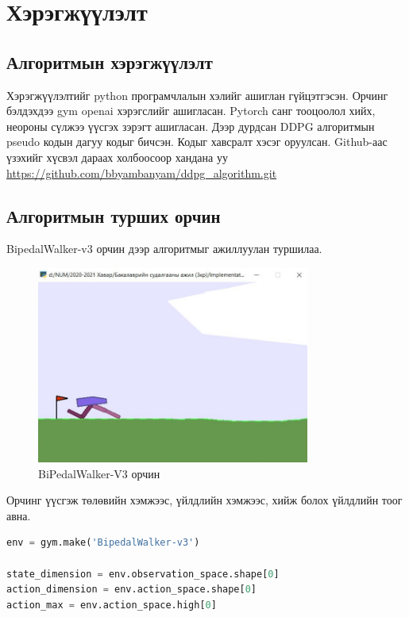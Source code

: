 \documentclass[12pt,A4]{report}
\begin{document}
\chapter{Хэрэгжүүлэлт}

\section{Алгоритмын хэрэгжүүлэлт}

Хэрэгжүүлэлтийг python програмчлалын хэлийг ашиглан гүйцэтгэсэн. Орчинг бэлдэхдээ gym openai хэрэгслийг ашигласан. Pytorch санг тооцоолол хийх, неороны сүлжээ үүсгэх зэрэгт ашигласан. Дээр дурдсан DDPG алгоритмын pseudo кодын дагуу кодыг бичсэн. Кодыг хавсралт хэсэг оруулсан. Github-аас үзэхийг хүсвэл дараах холбоосоор хандана уу \url{https://github.com/bbyambanyam/ddpg_algorithm.git}

\section{Алгоритмын турших орчин}

BipedalWalker-v3 орчин дээр алгоритмыг ажиллуулан туршилаа.

\begin{figure}[H]
\centering
\includegraphics[width=0.8\textwidth]{./images/bipedalwalker}
\caption{BiPedalWalker-V3 орчин}
\end{figure}

Орчинг үүсгэж төлөвийн хэмжээс, үйлдлийн хэмжээс, хийж болох үйлдлийн тоог авна.

\begin{lstlisting}[language=Python, caption=Орчин үүсгэх, frame=single]
env = gym.make('BipedalWalker-v3')

state_dimension = env.observation_space.shape[0]
action_dimension = env.action_space.shape[0]
action_max = env.action_space.high[0]
\end{lstlisting}
\end{document}
